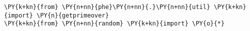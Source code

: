 
\begin{Verbatim}[commandchars=\\\{\}]
\PY{k+kn}{from} \PY{n+nn}{phe}\PY{n+nn}{.}\PY{n+nn}{util} \PY{k+kn}{import} \PY{n}{getprimeover}
\PY{k+kn}{from} \PY{n+nn}{random} \PY{k+kn}{import} \PY{o}{*}
\end{Verbatim}